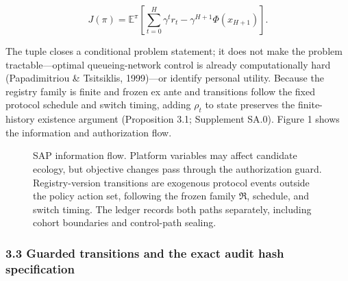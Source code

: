 \documentclass[
  11pt]{article}
\begin{document}
\[J(\pi)=\mathbb E^\pi\!\left[\sum_{t=0}^{H}\gamma^t r_t-\gamma^{H+1}\Phi(x_{H+1})\right].\tag{2}\]

The tuple closes a conditional problem statement; it does not make the
problem tractable---optimal queueing-network control is already
computationally hard (Papadimitriou \& Tsitsiklis, 1999)---or identify
personal utility. Because the registry family is finite and frozen ex
ante and transitions follow the fixed protocol schedule and switch
timing, adding \(\rho_t\) to state preserves the finite-history
existence argument (Proposition 3.1; Supplement SA.0). Figure 1 shows
the information and authorization flow.

\begin{figure}[htbp]
\centering
{}
\caption{SAP information flow. Platform variables may affect candidate ecology, but objective changes pass through the authorization guard. Registry-version transitions are exogenous protocol events outside the policy action set, following the frozen family $\mathfrak R$, schedule, and switch timing. The ledger records both paths separately, including cohort boundaries and control-path sealing.}
\label{fig:sap-flow}
\end{figure}

\subsubsection{3.3 Guarded transitions and the exact audit hash
specification}\label{guarded-transitions-and-the-exact-audit-hash-specification}
\end{document}
